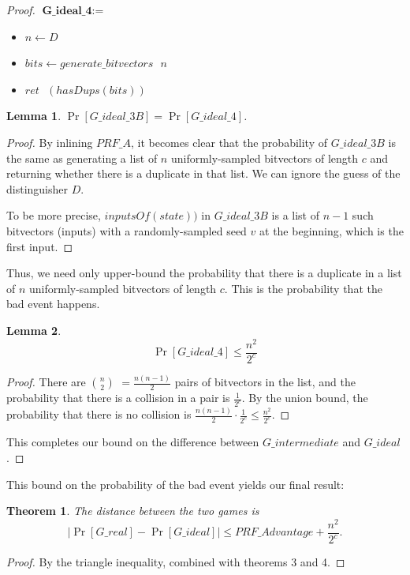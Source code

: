 \documentclass[12pt,lot, lof]{puthesis}
\newenvironment{game}
{ \begin{itemize}[noitemsep,nolistsep] 
}
{ \end{itemize}                  }
\newcommand{\s} {\textrm{ }}
\newcommand{\f}{\frac}
\newtheorem{thm}{Theorem}
\newtheorem{lem}{Lemma}[thm]
\begin{document}
\begin{proof}
$\textbf{G\_ideal\_4} := $
\begin{game}
\item[] $n \leftarrow D$
\item[] $bits \leftarrow generate\_bitvectors \s n$
\item[] $ret \s (hasDups(bits))$ 
\end{game}

\begin{lem}$\Pr[G\_ideal\_3B] = \Pr[G\_ideal\_4]$.\end{lem}
\begin{proof}
By inlining $PRF\_A$, it becomes clear that the probability of $G\_ideal\_3B$ is the same as generating a list of $n$ uniformly-sampled bitvectors of length $c$ and returning whether there is a duplicate in that list. We can ignore the guess of the distinguisher $D$. %

To be more precise, $inputsOf(state))$ in $G\_ideal\_3B$ is a list of $n-1$ such bitvectors (inputs) with a randomly-sampled seed $v$ at the beginning, which is the first input.
\end{proof}

Thus, we need only upper-bound the probability that there is a duplicate in a list of $n$ uniformly-sampled bitvectors of length $c$. This is the probability that the bad event happens.

\begin{lem}$$\Pr[G\_ideal\_4] \leq \f{n^2}{2^c}$$\end{lem}
\begin{proof} There are $n \choose 2$ $= \f{n(n-1)}{2}$ pairs of bitvectors in the list, and the probability that there is a collision in a pair is $\f{1}{2^c}$. By the union bound, the probability that there is no collision is $\f{n(n-1)}{2} \cdot \f{1}{2^c} \leq \f{n^2}{2^c}.$ \end{proof}

This completes our bound on the difference between $G\_intermediate$ and $G\_ideal$.
\end{proof}

This bound on the probability of the bad event yields our final result:

\begin{thm}The distance between the two games is $$| \Pr[G\_real] - \Pr[G\_ideal]| \leq PRF\_Advantage + \f{n^2}{2^c}.$$ \end{thm}
\begin{proof} By the triangle inequality, combined with theorems 3 and 4.\end{proof}
\end{document}

